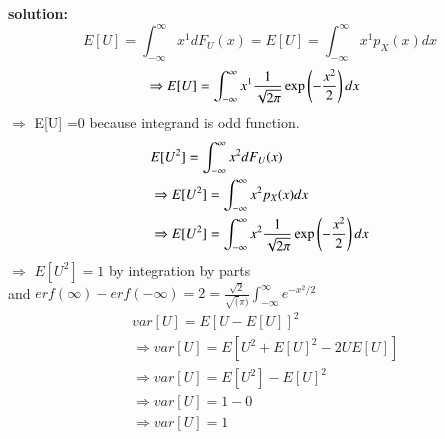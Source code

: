 \documentclass[journal,12pt,twocolumn]{IEEEtran}
\begin{document}
\textbf{solution:}
\begin{equation}
E[U] = \int_{-\infty}^{\infty}x^1dF_{U}(x)
= E[U]=\int_{-\infty}^{\infty}x^1p_X(x) dx \nonumber
\end{equation}
\begin{align}
&\Rightarrow E[U] =\int_{-\infty}^{\infty}x^1\frac{1}{\sqrt{2\pi}}\exp\left(-\frac{x^2}{2}\right) dx \nonumber
\end{align}
$\Rightarrow$ E[U] =0 because integrand is odd function.
\begin{align}
    &E[U^{2}]=\int_{-\infty}^{\infty}x^2dF_{U}(x)\nonumber\\
    &\Rightarrow E[U^{2}]=\int_{-\infty}^{\infty}x^2 p_X(x) dx\nonumber\\
    &\Rightarrow E[U^{2}]=\int_{-\infty}^{\infty}x^2\frac{1}{\sqrt{2\pi}}\exp\left(-\frac{x^2}{2}\right) dx \nonumber
\end{align}
$\Rightarrow$ $E[U^{2}]=1$  by integration by parts \\and $erf(\infty)-erf(-\infty)=2=\frac{\sqrt{2}}{\sqrt(\pi)}\int_{-\infty}^{\infty}e^{-x^{2}/2}$
\begin{align}
 &var[U]=E[U-E[U]]^{2}\\
 &\Rightarrow var[U]=E[U^{2}+E[U]^{2}-2UE[U]] \nonumber\\
 &\Rightarrow var[U]=E[U^{2}]-E[U]^{2} \nonumber\\
 &\Rightarrow var[U]=1 -0 \nonumber\\
 &\Rightarrow var[U]=1 \nonumber
\end{align}
\end{document}
